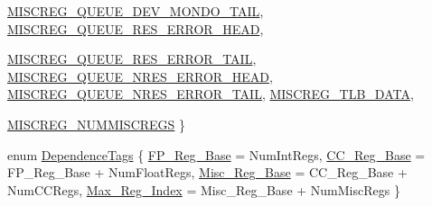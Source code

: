 \begin{DoxyCompactItemize}
\hyperlink{namespaceSparcISA_a1e522017e015d4c7efd6b2360143aa67aa4f306ee6aba7151262316d8d203112d}{MISCREG\_\-QUEUE\_\-DEV\_\-MONDO\_\-TAIL}, 
\hyperlink{namespaceSparcISA_a1e522017e015d4c7efd6b2360143aa67aff0d55bc222c2864b5bea1ee52fc9fec}{MISCREG\_\-QUEUE\_\-RES\_\-ERROR\_\-HEAD}, 
\par
\hyperlink{namespaceSparcISA_a1e522017e015d4c7efd6b2360143aa67a224ac155257ddebe65c41e19f5f90acd}{MISCREG\_\-QUEUE\_\-RES\_\-ERROR\_\-TAIL}, 
\hyperlink{namespaceSparcISA_a1e522017e015d4c7efd6b2360143aa67a0d614981712ccfac162204f0b56e927c}{MISCREG\_\-QUEUE\_\-NRES\_\-ERROR\_\-HEAD}, 
\hyperlink{namespaceSparcISA_a1e522017e015d4c7efd6b2360143aa67a007b515a82637761bc98d192103ba4df}{MISCREG\_\-QUEUE\_\-NRES\_\-ERROR\_\-TAIL}, 
\hyperlink{namespaceSparcISA_a1e522017e015d4c7efd6b2360143aa67a34e96fb9ddfda445e0f7f353b647e55f}{MISCREG\_\-TLB\_\-DATA}, 
\par
\hyperlink{namespaceSparcISA_a1e522017e015d4c7efd6b2360143aa67ad347463f724b554c56542add74724d6e}{MISCREG\_\-NUMMISCREGS}
 \}
\item 
enum \hyperlink{namespaceSparcISA_a4720195f4575f008ac78181d27db827e}{DependenceTags} \{ \hyperlink{namespaceSparcISA_a4720195f4575f008ac78181d27db827ea23c089ac23981fe820094e2fc1579bf4}{FP\_\-Reg\_\-Base} =  NumIntRegs, 
\hyperlink{namespaceSparcISA_a4720195f4575f008ac78181d27db827eae261857dbef59e0d93992a1e2d1fa322}{CC\_\-Reg\_\-Base} =  FP\_\-Reg\_\-Base + NumFloatRegs, 
\hyperlink{namespaceSparcISA_a4720195f4575f008ac78181d27db827ea0cbf9912f8507e55495a158f1b94f803}{Misc\_\-Reg\_\-Base} =  CC\_\-Reg\_\-Base + NumCCRegs, 
\hyperlink{namespaceSparcISA_a4720195f4575f008ac78181d27db827ea0693397933007a82bea39457bd7a7151}{Max\_\-Reg\_\-Index} =  Misc\_\-Reg\_\-Base + NumMiscRegs
 \}
\end{DoxyCompactItemize}
